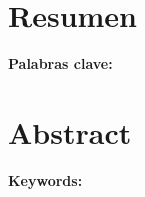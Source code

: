 \chapter*{Resumen}
\thispagestyle{empty}



\bigskip

\textbf{Palabras clave:} \scriptKeywords

\clearpage
\chapter*{Abstract}
\thispagestyle{empty}



\bigskip

\textbf{Keywords:}

\cleardoublepage

